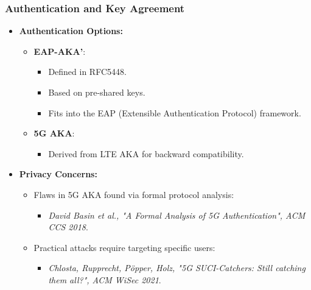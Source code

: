 \subsubsection{Authentication and Key Agreement}
\begin{itemize}
    \item \textbf{Authentication Options:}
    \begin{itemize}
        \item \textbf{EAP-AKA'}:
        \begin{itemize}
            \item Defined in RFC5448.
            \item Based on pre-shared keys.
            \item Fits into the EAP (Extensible Authentication Protocol) framework.
        \end{itemize}
        \item \textbf{5G AKA}:
        \begin{itemize}
            \item Derived from LTE AKA for backward compatibility.
        \end{itemize}
    \end{itemize}

    \item \textbf{Privacy Concerns:}
    \begin{itemize}
        \item Flaws in 5G AKA found via formal protocol analysis:
        \begin{itemize}
            \item \textit{David Basin et al., "A Formal Analysis of 5G Authentication", ACM CCS 2018}.
        \end{itemize}
        \item Practical attacks require targeting specific users:
        \begin{itemize}
            \item \textit{Chlosta, Rupprecht, Pöpper, Holz, "5G SUCI-Catchers: Still catching them all?", ACM WiSec 2021}.
        \end{itemize}
    \end{itemize}
\end{itemize}

